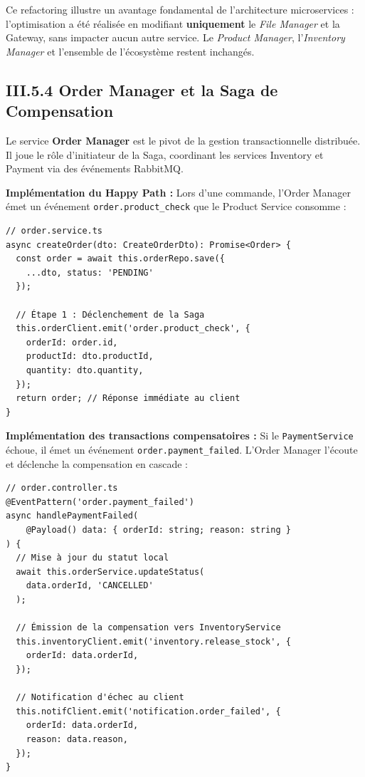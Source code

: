 Ce refactoring illustre un avantage fondamental de l'architecture microservices : l'optimisation a été réalisée en modifiant \textbf{uniquement} le \textit{File Manager} et la Gateway, sans impacter aucun autre service. Le \textit{Product Manager}, l'\textit{Inventory Manager} et l'ensemble de l'écosystème restent inchangés.

\subsection{III.5.4 Order Manager et la Saga de Compensation}
Le service \textbf{Order Manager} est le pivot de la gestion transactionnelle distribu\'ee. Il joue le rôle d'initiateur de la Saga, coordinant les services Inventory et Payment via des \'ev\'enements RabbitMQ.

\textbf{Impl\'ementation du Happy Path :}
Lors d'une commande, l'Order Manager \'emet un \'ev\'enement \texttt{order.product\_check} que le Product Service consomme :

\begin{verbatim}
// order.service.ts
async createOrder(dto: CreateOrderDto): Promise<Order> {
  const order = await this.orderRepo.save({
    ...dto, status: 'PENDING'
  });

  // Étape 1 : Déclenchement de la Saga
  this.orderClient.emit('order.product_check', {
    orderId: order.id,
    productId: dto.productId,
    quantity: dto.quantity,
  });
  return order; // Réponse immédiate au client
}
\end{verbatim}

\textbf{Impl\'ementation des transactions compensatoires :}
Si le \texttt{PaymentService} \'echoue, il \'emet un \'ev\'enement \texttt{order.payment\_failed}. L'Order Manager l'\'ecoute et d\'eclenche la compensation en cascade :

\begin{verbatim}
// order.controller.ts
@EventPattern('order.payment_failed')
async handlePaymentFailed(
    @Payload() data: { orderId: string; reason: string }
) {
  // Mise à jour du statut local
  await this.orderService.updateStatus(
    data.orderId, 'CANCELLED'
  );

  // Émission de la compensation vers InventoryService
  this.inventoryClient.emit('inventory.release_stock', {
    orderId: data.orderId,
  });

  // Notification d'échec au client
  this.notifClient.emit('notification.order_failed', {
    orderId: data.orderId,
    reason: data.reason,
  });
}
\end{verbatim}

